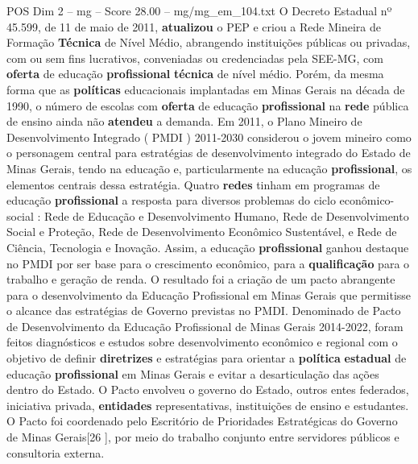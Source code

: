 \begin{textsample}{POS Dim 2 – mg – Score 28.00 – mg/mg\_em\_104.txt}
O Decreto Estadual nº 45.599, de 11 de maio de 2011, \textbf{atualizou} o PEP e criou a Rede Mineira de Formação \textbf{Técnica} de Nível Médio, abrangendo instituições públicas ou privadas, com ou sem fins lucrativos, conveniadas ou credenciadas pela SEE-MG, com \textbf{oferta} de educação \textbf{profissional} \textbf{técnica} de nível médio.
Porém, da mesma forma que as \textbf{políticas} educacionais implantadas em Minas Gerais na década de 1990, o número de escolas com \textbf{oferta} de educação \textbf{profissional} na \textbf{rede} pública de ensino ainda não \textbf{atendeu} a demanda.
Em 2011, o Plano Mineiro de Desenvolvimento Integrado ( PMDI ) 2011-2030 considerou o jovem mineiro como o personagem central para estratégias de desenvolvimento integrado do Estado de Minas Gerais, tendo na educação e, particularmente na educação \textbf{profissional}, os elementos centrais dessa estratégia.
Quatro \textbf{redes} tinham em programas de educação \textbf{profissional} a resposta para diversos problemas do ciclo econômico-social : Rede de Educação e Desenvolvimento Humano, Rede de Desenvolvimento Social e Proteção, Rede de Desenvolvimento Econômico Sustentável, e Rede de Ciência, Tecnologia e Inovação.
Assim, a educação \textbf{profissional} ganhou destaque no PMDI por ser base para o crescimento econômico, para a \textbf{qualificação} para o trabalho e geração de renda.
O resultado foi a criação de um pacto abrangente para o desenvolvimento da Educação Profissional em Minas Gerais que permitisse o alcance das estratégias de Governo previstas no PMDI.
Denominado de Pacto de Desenvolvimento da Educação Profissional de Minas Gerais 2014-2022, foram feitos diagnósticos e estudos sobre desenvolvimento econômico e regional com o objetivo de definir \textbf{diretrizes} e estratégias para orientar a \textbf{política} \textbf{estadual} de educação \textbf{profissional} em Minas Gerais e evitar a desarticulação das ações dentro do Estado.
O Pacto envolveu o governo do Estado, outros entes federados, iniciativa privada, \textbf{entidades} representativas, instituições de ensino e estudantes.
O Pacto foi coordenado pelo Escritório de Prioridades Estratégicas do Governo de Minas Gerais[26 ], por meio do trabalho conjunto entre servidores públicos e consultoria externa.

\end{textsample}
